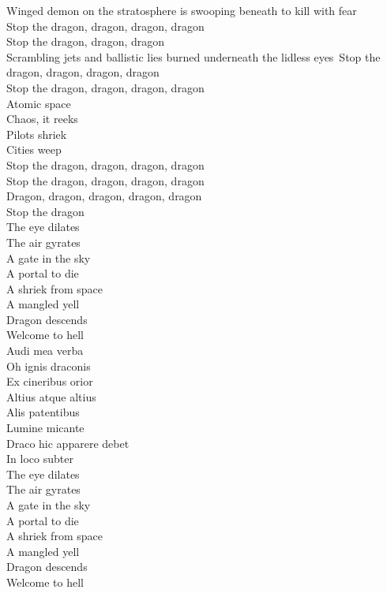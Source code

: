 Winged demon on the stratosphere is swooping beneath to kill with fear\\
Stop the dragon, dragon, dragon, dragon\\
Stop the dragon, dragon, dragon\\
Scrambling jets and ballistic lies burned underneath the lidless eyes\
Stop the dragon, dragon, dragon, dragon\\
Stop the dragon, dragon, dragon, dragon\\
Atomic space\\
Chaos, it reeks\\
Pilots shriek\\
Cities weep\\
Stop the dragon, dragon, dragon, dragon\\
Stop the dragon, dragon, dragon, dragon\\
Dragon, dragon, dragon, dragon, dragon\\
Stop the dragon\\

The eye dilates\\
The air gyrates\\
A gate in the sky\\
A portal to die\\
A shriek from space\\
A mangled yell\\
Dragon descends\\
Welcome to hell\\

Audi mea verba\\
Oh ignis draconis\\
Ex cineribus orior\\
Altius atque altius\\
Alis patentibus\\
Lumine micante\\
Draco hic apparere debet\\
In loco subter\\

The eye dilates\\
The air gyrates\\
A gate in the sky\\
A portal to die\\
A shriek from space\\
A mangled yell\\
Dragon descends\\
Welcome to hell\\


